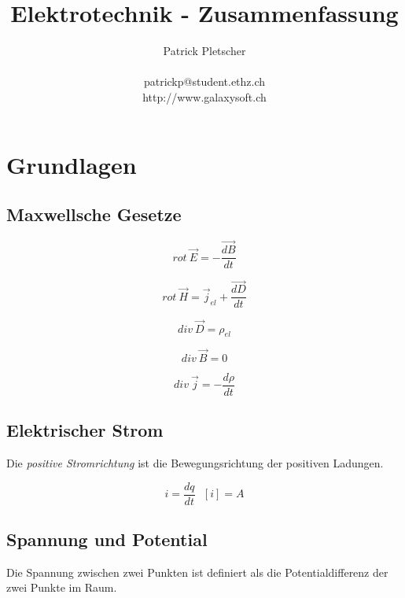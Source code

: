 \documentclass[german, 10pt, a4paper, headsepline]{scrreprt}
\title{Elektrotechnik - Zusammenfassung}
\author{Patrick Pletscher\\ \\
patrickp@student.ethz.ch\\
http://www.galaxysoft.ch
}
\theoremstyle{remark}
\begin{document}
\maketitle


\tableofcontents

\chapter{Grundlagen}

\section{Maxwellsche Gesetze}

\begin{displaymath}
	rot\:\vec{E}=-\frac{\vec{dB}}{dt}
\end{displaymath}

\begin{displaymath}
	rot\:\vec{H}=\vec{j}_{el}+\frac{\vec{dD}}{dt}
\end{displaymath}

\begin{displaymath}
	div\:\vec{D}=\rho_{el}
\end{displaymath}

\begin{displaymath}
	div\:\vec{B}=0
\end{displaymath}

\begin{displaymath}
	div\:\vec{j}=-\frac{d\rho}{dt}
\end{displaymath}

\section{Elektrischer Strom}

Die \textit{positive Stromrichtung} ist die Bewegungsrichtung der positiven Ladungen.

\begin{displaymath}
	i=\frac{dq}{dt}\:\:\:[i]=A
\end{displaymath}

\section{Spannung und Potential}

Die Spannung zwischen zwei Punkten ist definiert als die Potentialdifferenz der zwei Punkte im Raum.
\end{document}
